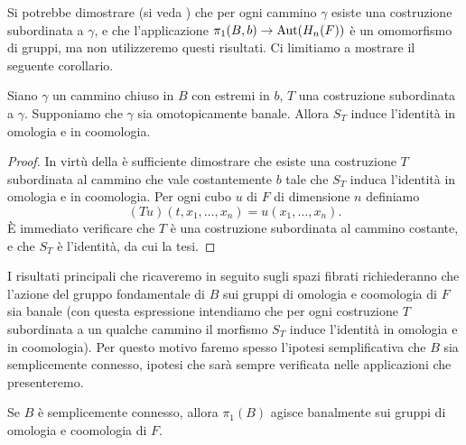 Si potrebbe dimostrare (si veda ) che per ogni cammino \(\gamma\) esiste una costruzione subordinata a \(\gamma\), e che l'applicazione \(\pi_1(B,b)\to\operatorname{Aut}(H_n(F))\) è un omomorfismo di gruppi, ma non utilizzeremo questi risultati.
Ci limitiamo a mostrare il seguente corollario.
\begin{corollary}
Siano \(\gamma\) un cammino chiuso in \(B\) con estremi in \(b\), \(T\) una costruzione subordinata a \(\gamma\). Supponiamo che \(\gamma\) sia omotopicamente banale. Allora \(S_T\) induce l'identità in omologia e in coomologia.
\end{corollary}
\begin{proof}
In virtù della  è sufficiente dimostrare che esiste una costruzione \(T\) subordinata al cammino che vale costantemente \(b\) tale che \(S_T\) induca l'identità in omologia e in coomologia. Per ogni cubo \(u\) di \(F\) di dimensione \(n\) definiamo
\[
(Tu)(t,x_1,\ldots,x_n)=u(x_1,\ldots,x_n).
\]
È immediato verificare che \(T\) è una costruzione subordinata al cammino costante, e che \(S_T\) è l'identità, da cui la tesi.
\end{proof}

I risultati principali che ricaveremo in seguito sugli spazi fibrati richiederanno che l'azione del gruppo fondamentale di \(B\) sui gruppi di omologia e coomologia di \(F\) sia banale (con questa espressione intendiamo che per ogni costruzione \(T\) subordinata a un qualche cammino il morfismo \(S_T\) induce l'identità in omologia e in coomologia). Per questo motivo faremo spesso l'ipotesi semplificativa che \(B\) sia semplicemente connesso, ipotesi che sarà sempre verificata nelle applicazioni che presenteremo.

\begin{corollary}
Se \(B\) è semplicemente connesso, allora \(\pi_1(B)\) agisce banalmente sui gruppi di omologia e coomologia di \(F\).
\end{corollary}

